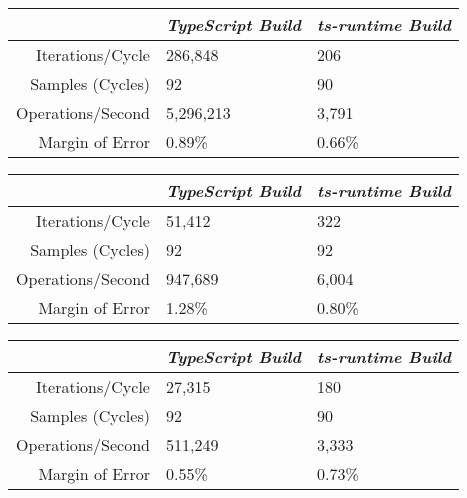 \begin{center}
{
\centering
\tabulinesep=1.2mm
\setlength{\tabcolsep}{5mm}
\def\arraystretch{1.25}
\small
\begin{tabu} to \textwidth {|r||X[c,m]|X[c,m]|}
  \hline
  & \emph{TypeScript Build} & \emph{ts-runtime Build} \\
  \hline
  \hline
  Iterations/Cycle  & 286,848 & 206 \\
  \hline
  Samples (Cycles)  & 92 & 90 \\
  \hline
  Operations/Second & 5,296,213 & 3,791 \\
  \hline
  Margin of Error   & 0.89\% & 0.66\% \\
  \hline
\end{tabu}
}
\end{center}

\begin{center}
{
\centering
\tabulinesep=1.2mm
\setlength{\tabcolsep}{5mm}
\def\arraystretch{1.25}
\small
\begin{tabu} to \textwidth {|r||X[c,m]|X[c,m]|}
  \hline
  & \emph{TypeScript Build} & \emph{ts-runtime Build} \\
  \hline
  \hline
  Iterations/Cycle  & 51,412 & 322 \\
  \hline
  Samples (Cycles)  & 92 & 92 \\
  \hline
  Operations/Second & 947,689 & 6,004 \\
  \hline
  Margin of Error   & 1.28\% & 0.80\% \\
  \hline
\end{tabu}
}
\end{center}

\begin{center}
{
\centering
\tabulinesep=1.2mm
\setlength{\tabcolsep}{5mm}
\def\arraystretch{1.25}
\small
\begin{tabu} to \textwidth {|r||X[c,m]|X[c,m]|}
  \hline
  & \emph{TypeScript Build} & \emph{ts-runtime Build} \\
  \hline
  \hline
  Iterations/Cycle  & 27,315 & 180 \\
  \hline
  Samples (Cycles)  & 92 & 90 \\
  \hline
  Operations/Second & 511,249 & 3,333 \\
  \hline
  Margin of Error   & 0.55\% & 0.73\% \\
  \hline
\end{tabu}
}
\end{center}

